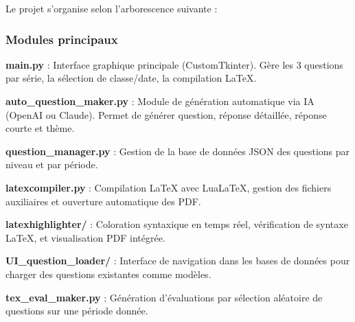 Le projet s'organise selon l'arborescence suivante :

\begin{center}
\begin{minipage}{0.8\textwidth}
\end{minipage}
\end{center}

\subsubsection{Modules principaux}

\begin{tcbenumerate}
    \tcbitem \textbf{main.py} : Interface graphique principale (CustomTkinter). Gère les 3 questions par série, la sélection de classe/date, la compilation LaTeX.

    \tcbitem \textbf{auto\_question\_maker.py} : Module de génération automatique via IA (OpenAI ou Claude). Permet de générer question, réponse détaillée, réponse courte et thème.

    \tcbitem \textbf{question\_manager.py} : Gestion de la base de données JSON des questions par niveau et par période.

    \tcbitem \textbf{latexcompiler.py} : Compilation LaTeX avec LuaLaTeX, gestion des fichiers auxiliaires et ouverture automatique des PDF.

    \tcbitem \textbf{latexhighlighter/} : Coloration syntaxique en temps réel, vérification de syntaxe LaTeX, et visualisation PDF intégrée.

    \tcbitem \textbf{UI\_question\_loader/} : Interface de navigation dans les bases de données pour charger des questions existantes comme modèles.

    \tcbitem \textbf{tex\_eval\_maker.py} : Génération d'évaluations par sélection aléatoire de questions sur une période donnée.
\end{tcbenumerate} 


